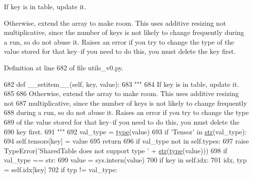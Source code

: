 \begin{DoxyVerb}If key is in table, update it.

Otherwise, extend the array to make room. This uses additive resizing not
multiplicative, since the number of keys is not likely to change frequently
during a run, so do not abuse it. Raises an error if you try to change the type
of the value stored for that key--if you need to do this, you must delete the
key first.
\end{DoxyVerb}
 

Definition at line 682 of file utils\+\_\+v0.\+py.


\begin{DoxyCode}
682     \textcolor{keyword}{def }\_\_setitem\_\_(self, key, value):
683         \textcolor{stringliteral}{"""}
684 \textcolor{stringliteral}{        If key is in table, update it.}
685 \textcolor{stringliteral}{}
686 \textcolor{stringliteral}{        Otherwise, extend the array to make room. This uses additive resizing not}
687 \textcolor{stringliteral}{        multiplicative, since the number of keys is not likely to change frequently}
688 \textcolor{stringliteral}{        during a run, so do not abuse it. Raises an error if you try to change the type}
689 \textcolor{stringliteral}{        of the value stored for that key--if you need to do this, you must delete the}
690 \textcolor{stringliteral}{        key first.}
691 \textcolor{stringliteral}{        """}
692         val\_type = \hyperlink{namespaceparlai_1_1agents_1_1tfidf__retriever_1_1build__tfidf_ad5dfae268e23f506da084a9efb72f619}{type}(value)
693         \textcolor{keywordflow}{if} \textcolor{stringliteral}{'Tensor'} \textcolor{keywordflow}{in} \hyperlink{namespacegenerate__task__READMEs_a5b88452ffb87b78c8c85ececebafc09f}{str}(val\_type):
694             self.tensors[key] = value
695             \textcolor{keywordflow}{return}
696         \textcolor{keywordflow}{if} val\_type \textcolor{keywordflow}{not} \textcolor{keywordflow}{in} self.types:
697             \textcolor{keywordflow}{raise} TypeError(\textcolor{stringliteral}{'SharedTable does not support type '} + \hyperlink{namespacegenerate__task__READMEs_a5b88452ffb87b78c8c85ececebafc09f}{str}(\hyperlink{namespaceparlai_1_1agents_1_1tfidf__retriever_1_1build__tfidf_ad5dfae268e23f506da084a9efb72f619}{type}(value)))
698         \textcolor{keywordflow}{if} val\_type == str:
699             value = sys.intern(value)
700         \textcolor{keywordflow}{if} key \textcolor{keywordflow}{in} self.idx:
701             idx, typ = self.idx[key]
702             \textcolor{keywordflow}{if} typ != val\_type:

\end{DoxyCode}
